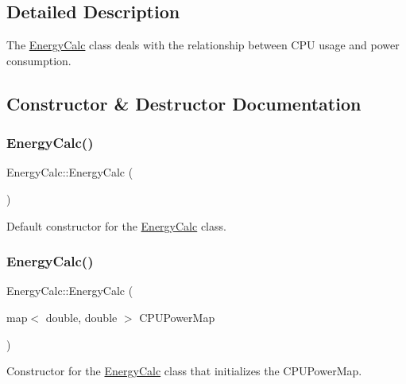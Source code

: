 \subsection{Detailed Description}
The \hyperlink{classEnergyCalc}{Energy\+Calc} class deals with the relationship between C\+PU usage and power consumption. 

\subsection{Constructor \& Destructor Documentation}
\mbox{\label{classEnergyCalc_a6379ce8e645c7c8c2acaca31f4c350ff}} 
\subsubsection{\texorpdfstring{Energy\+Calc()}{EnergyCalc()}\hspace{0.1cm}{\footnotesize\ttfamily [1/2]}}
{\footnotesize\ttfamily Energy\+Calc\+::\+Energy\+Calc (\begin{DoxyParamCaption}{ }\end{DoxyParamCaption})}



Default constructor for the \hyperlink{classEnergyCalc}{Energy\+Calc} class. 

\mbox{\label{classEnergyCalc_aaab4e727de884101dd0523ee331f8326}} 
\subsubsection{\texorpdfstring{Energy\+Calc()}{EnergyCalc()}\hspace{0.1cm}{\footnotesize\ttfamily [2/2]}}
{\footnotesize\ttfamily Energy\+Calc\+::\+Energy\+Calc (\begin{DoxyParamCaption}\item[{map$<$ double, double $>$}]{C\+P\+U\+Power\+Map }\end{DoxyParamCaption})}



Constructor for the \hyperlink{classEnergyCalc}{Energy\+Calc} class that initializes the C\+P\+U\+Power\+Map. 


